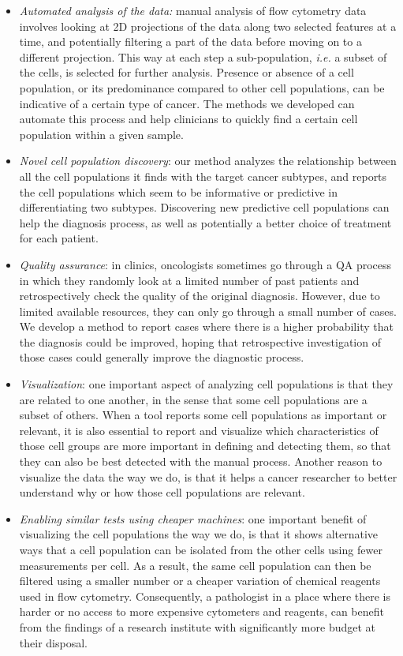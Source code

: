 \begin{itemize}
  \item \emph{Automated analysis of the data:} manual analysis of flow
    cytometry data involves looking at 2D projections of the data along two
    selected features at a time, and potentially filtering a part of the data
    before moving on to a different projection. This way at each step a
    sub-population, \emph{i.e.} a subset of the cells, is selected for further
    analysis. Presence or absence of a cell population, or its predominance
    compared to other cell populations, can be indicative of a certain type of
    cancer. The methods we developed can automate this process and help
    clinicians to quickly find a certain cell population within a given sample.
  \item \emph{Novel cell population discovery}: our method analyzes the
    relationship between all the cell populations it finds with the target
    cancer subtypes, and reports the cell populations which seem to be
    informative or predictive in differentiating two subtypes. Discovering new
    predictive cell populations can help the diagnosis process, as well as
    potentially a better choice of treatment for each patient.
  \item \emph{Quality assurance}: in clinics, oncologists sometimes go through
    a QA process in which they randomly look at a limited number of past
    patients and retrospectively check the quality of the original diagnosis.
    However, due to limited available resources, they can only go through a
    small number of cases. We develop a method to report cases where there is a
    higher probability that the diagnosis could be improved, hoping that
    retrospective investigation of those cases could generally improve the
    diagnostic process.
  \item \emph{Visualization}: one important aspect of analyzing cell
    populations is that they are related to one another, in the sense that some
    cell populations are a subset of others. When a tool reports some cell
    populations as important or relevant, it is also essential to report and
    visualize which characteristics of those cell groups are more important in
    defining and detecting them, so that they can also be best detected with
    the manual process. Another reason to visualize the data the way we do, is
    that it helps a cancer researcher to better understand why or how those
    cell populations are relevant.
  \item \emph{Enabling similar tests using cheaper machines}: one important
    benefit of visualizing the cell populations the way we do, is that it shows
    alternative ways that a cell population can be isolated from the other
    cells using fewer measurements per cell. As a result, the same cell
    population can then be filtered using a smaller number or a cheaper
    variation of chemical reagents used in flow cytometry. Consequently, a
    pathologist in a place where there is harder or no access to more expensive
    cytometers and reagents, can benefit from the findings of a research
    institute with significantly more budget at their disposal.
\end{itemize}

